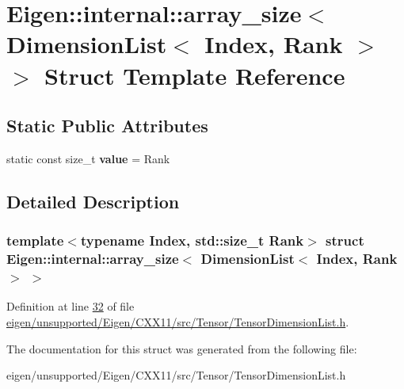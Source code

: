 \hypertarget{struct_eigen_1_1internal_1_1array__size_3_01_dimension_list_3_01_index_00_01_rank_01_4_01_4}{}\section{Eigen\+:\+:internal\+:\+:array\+\_\+size$<$ Dimension\+List$<$ Index, Rank $>$ $>$ Struct Template Reference}
\label{struct_eigen_1_1internal_1_1array__size_3_01_dimension_list_3_01_index_00_01_rank_01_4_01_4}
\subsection*{Static Public Attributes}
\begin{DoxyCompactItemize}
\item 
\mbox{\label{struct_eigen_1_1internal_1_1array__size_3_01_dimension_list_3_01_index_00_01_rank_01_4_01_4_a22de04fb83d3ac760ac1efae2b853baa}} 
static const size\+\_\+t {\bfseries value} = Rank
\end{DoxyCompactItemize}


\subsection{Detailed Description}
\subsubsection*{template$<$typename Index, std\+::size\+\_\+t Rank$>$\newline
struct Eigen\+::internal\+::array\+\_\+size$<$ Dimension\+List$<$ Index, Rank $>$ $>$}



Definition at line \hyperlink{eigen_2unsupported_2_eigen_2_c_x_x11_2src_2_tensor_2_tensor_dimension_list_8h_source_l00032}{32} of file \hyperlink{eigen_2unsupported_2_eigen_2_c_x_x11_2src_2_tensor_2_tensor_dimension_list_8h_source}{eigen/unsupported/\+Eigen/\+C\+X\+X11/src/\+Tensor/\+Tensor\+Dimension\+List.\+h}.



The documentation for this struct was generated from the following file\+:\begin{DoxyCompactItemize}
\item 
eigen/unsupported/\+Eigen/\+C\+X\+X11/src/\+Tensor/\+Tensor\+Dimension\+List.\+h\end{DoxyCompactItemize}
